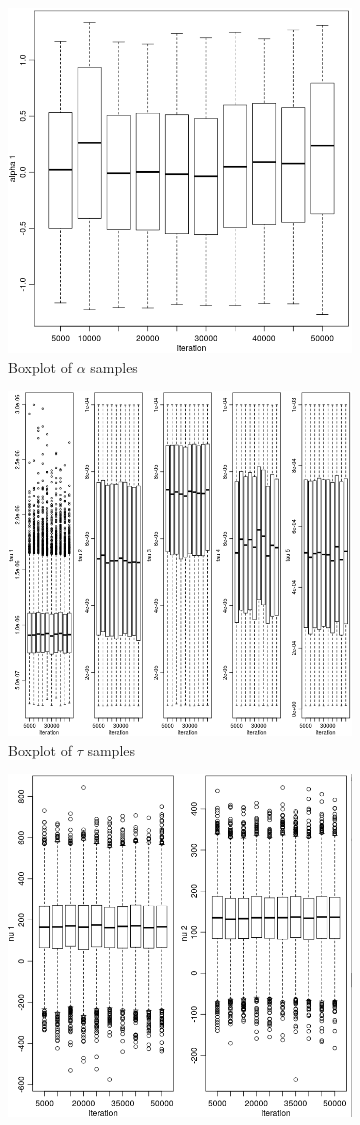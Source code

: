 \documentclass[11pt,twoside]{report}
\begin{document}
\begin{figure}[H]
	\begin{subfigure}[H]{0.50\linewidth}
	\centering
	\includegraphics[width=70 mm]{pictures/m2_s1.png}
	\caption{Boxplot of $ \alpha $ samples}
	\label{fig:M2_s1}
\end{subfigure}
\hfill
\begin{subfigure}[H]{0.50\linewidth}
	\centering
	\includegraphics[width=70 mm]{pictures/m2_s2.png}
	\caption{Boxplot of $ \tau $ samples}
	\label{fig:M2_s2}
\end{subfigure}%
\vfill
	\begin{subfigure}[H]{0.50\linewidth}
	\centering
	\includegraphics[width=70 mm]{pictures/m2_s3.png}

\end{subfigure}
\end{figure}
\end{document}
